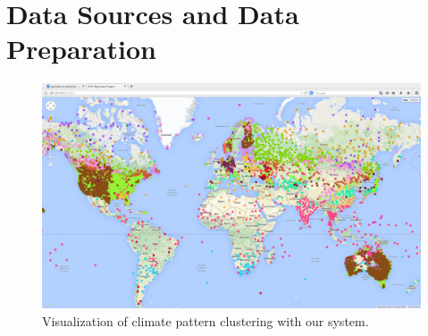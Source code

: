 \section{Data Sources and Data Preparation}

\begin{figure}[H]
\centering
\includegraphics[width=.85\linewidth]{./figure/Full_view.png}
	\caption{Visualization of climate pattern clustering with our system.}
	\label{fig:FullView}
\end{figure}
